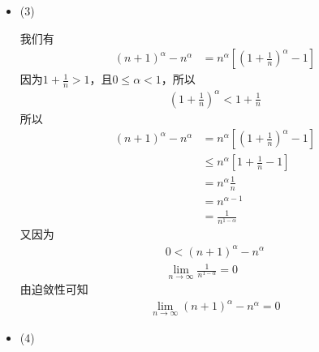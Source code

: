 \documentclass{article}
\begin{document}
\begin{itemize}
  \item (3)

        我们有
        \begin{align*}
          (n+1)^\alpha - n^\alpha & = n^\alpha [(1 + \frac{1}{n})^\alpha - 1]
        \end{align*}
        因为$1 + \frac{1}{n} > 1$，且$0 \leq \alpha < 1$，所以
        \begin{align*}
          (1 + \frac{1}{n})^\alpha < 1 + \frac{1}{n}
        \end{align*}
        所以
        \begin{align*}
          (n+1)^\alpha - n^\alpha & = n^\alpha [(1 + \frac{1}{n})^\alpha - 1] \\
                                  & \leq n^\alpha [1 + \frac{1}{n} - 1]       \\
                                  & = n^\alpha \frac{1}{n}                    \\
                                  & = n^{\alpha - 1}                          \\
                                  & = \frac{1}{n^{1 - \alpha}}
        \end{align*}
        又因为
        \begin{align*}
          0 < (n+1)^\alpha - n^\alpha \\
          \lim\limits_{n \to \infty} \frac{1}{n^{1 - \alpha}} = 0
        \end{align*}
        由迫敛性可知
        \begin{align*}
          \lim\limits_{n \to \infty} (n+1)^\alpha - n^\alpha = 0
        \end{align*}
  \item (4)


\end{itemize}
\end{document}
